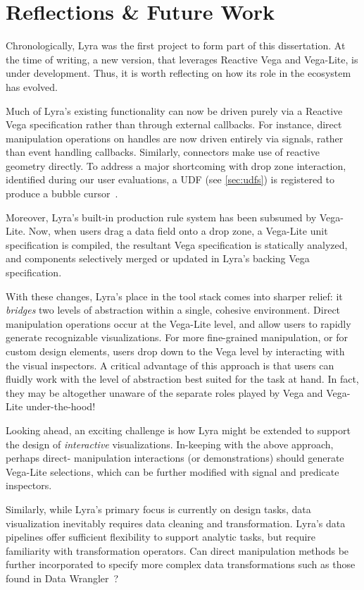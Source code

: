 \section{Reflections \& Future Work}

Chronologically, Lyra was the first project to form part of this dissertation.
At the time of writing, a new version, that leverages Reactive Vega and
Vega-Lite, is under development. Thus, it is worth reflecting on how its role in
the ecosystem has evolved.

Much of Lyra's existing functionality can now be driven purely via a Reactive
Vega specification rather than through external callbacks. For instance,
direct manipulation operations on handles are now driven entirely via signals,
rather than event handling callbacks. Similarly, connectors make use of reactive
geometry directly. To address a major shortcoming with drop zone interaction,
identified during our user evaluations, a UDF (see \cref{sec:udfs}) is
registered to produce a bubble cursor~\cite{grossman:bubble}.

Moreover, Lyra's built-in production rule system has been subsumed by Vega-Lite.
Now, when users drag a data field onto a drop zone, a Vega-Lite unit
specification is compiled, the resultant Vega specification is statically
analyzed, and components selectively merged or updated in Lyra's backing Vega
specification.

With these changes, Lyra's place in the tool stack comes into sharper relief: it
\emph{bridges} two levels of abstraction within a single, cohesive environment.
Direct manipulation operations occur at the Vega-Lite level, and allow users to
rapidly generate recognizable visualizations. For more fine-grained
manipulation, or for custom design elements, users drop down to the Vega level
by interacting with the visual inspectors. A critical advantage of this approach
is that users can fluidly work with the level of abstraction best suited for the
task at hand. In fact, they may be altogether unaware of the separate roles
played by Vega and Vega-Lite under-the-hood!

Looking ahead, an exciting challenge is how Lyra might be extended to support
the design of \emph{interactive} visualizations. In-keeping with the above
approach, perhaps direct- manipulation interactions (or demonstrations) should
generate Vega-Lite selections, which can be further modified with signal and
predicate inspectors.

Similarly, while Lyra's primary focus is currently on design tasks, data
visualization inevitably requires data cleaning and transformation. Lyra's data
pipelines offer sufficient flexibility to support analytic tasks, but require
familiarity with transformation operators. Can direct manipulation methods be
further incorporated to specify more complex data transformations such as those
found in Data Wrangler~\cite{kandel:wrangler}?